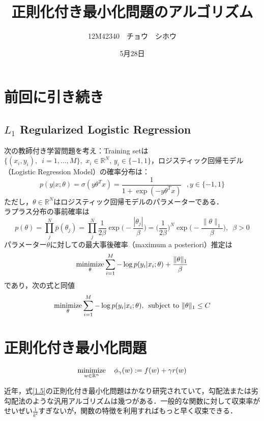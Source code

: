 \documentclass[a4paper,11pt]{jsarticle}
\title{正則化付き最小化問題のアルゴリズム}
\author{12M42340　チョウ　シホウ}
\date{5月28日}
\numberwithin{theorem}{section}  %
\numberwithin{equation}{section} %
\newcommand{\st}{\mathop{\rm subject~to\,}\limits}
\newcommand{\minimize}{\mathop{\mathrm{\rm minimize}}\limits}
\begin{document}
{}
\renewcommand{\thepart}{\arabic{part}}

\thispagestyle{empty}
\section{前回に引き続き}
\subsection{ $L_1$ Regularized Logistic Regression }
次の教師付き学習問題を考え：Training setは$ \{ (x_i,y_i),\,\,\, i= 1,\dots,M \},\,\, x_i \in \mathbb{R}^N, \, y_i \in \{ -1,1 \}$，ロジスティック回帰モデル（Logistic Regression Model）の確率分布は：
\begin{equation}
p(y|x;\theta) = \sigma(y\theta^Tx) = \frac{1}{1+ \exp(- y\theta^T x)}
\,\,\,\, ,y \in \{-1,1\}
\end{equation}
ただし，$\theta \in \mathbb{R}^N$はロジスティック回帰モデルのパラメーターである．\\
ラプラス分布の事前確率は
\begin{equation}
p(\theta) = \prod_{j}^N \bar{p}(\theta_j) = \prod_{j}^N \frac{1}{2\beta}\exp \Bigr( -\frac{|\theta_j |}{\beta} \Bigr) = \Bigr(\frac{1}{2\beta}\Bigr)^N \exp\Bigr(-\frac{\| \theta \|_1}{\beta}\Bigr), \,\,\, \beta > 0
\end{equation}
パラメーター$\theta$に対しての最大事後確率（maximum a posteriori）推定は
\begin{equation}
\minimize_{\theta} \sum_{i=1}^M -\log p(y_i | x_i;\theta) + \frac{\| \theta \|_1}{\beta}
\end{equation}
であり，次の式と同値
\begin{equation}
\minimize_{\theta} \sum_{i=1}^M -\log p(y_i | x_i;\theta),\,\,\, \st \| \theta \|_1 \le C
\end{equation}
\section{正則化付き最小化問題}
\begin{equation}
\minimize_{w \in \mathbb{R}^n}\,\,\,\,\,\,\phi_{\gamma}(w):=f(w)+\gamma r(w) \label{1.5}
\end{equation}

近年，式\ref{1.5}の正則化付き最小化問題はかなり研究されていて，勾配法または劣勾配法のような汎用アルゴリズムは幾つがある．一般的な関数に対して収束率がせいぜい$\frac{1}{k^2}$すぎないが，関数の特徴を利用すればもっと早く収束できる．
\end{document}
